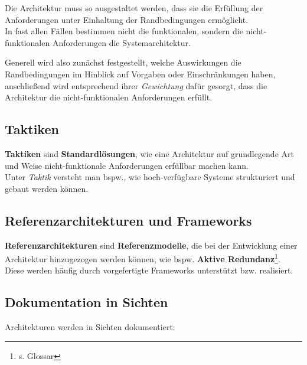\vspace{2mm}
\begin{tcolorbox}
    Die Architektur muss so ausgestaltet werden, dass sie die Erfüllung der Anforderungen unter Einhaltung der Randbedingungen ermöglicht.\\
    In fast allen Fällen bestimmen nicht die funktionalen, sondern die nicht-funktionalen Anforderungen die Systemarchitektur.
\end{tcolorbox}
\vspace{2mm}

\noindent
Generell wird also zunächst festgestellt, welche Auswirkungen die Randbedingungen im Hinblick auf Vorgaben oder Einschränkungen haben, anschließend wird entsprechend ihrer \textit{Gewichtung} dafür gesorgt, dass die Architektur die nicht-funktionalen Anforderungen erfüllt.

\subsection*{Taktiken}
\textbf{Taktiken} sind \textbf{Standardlösungen}, wie eine Architektur auf grundlegende Art und Weise nicht-funktionale Anforderungen erfüllbar machen kann.\\
Unter \textit{Taktik} versteht man bspw., wie hoch-verfügbare Systeme strukturiert und gebaut werden können.

\subsection*{Referenzarchitekturen und Frameworks}
\textbf{Referenzarchitekturen} sind \textbf{Referenzmodelle}, die bei der Entwicklung einer Architektur hinzugezogen werden können, wie bspw. \textbf{Aktive Redundanz}\footnote{s. Glossar}.\\

\noindent
Diese werden häufig durch vorgefertigte Frameworks unterstützt bzw. realisiert.

\subsection*{Dokumentation in Sichten}
Architekturen werden in Sichten dokumentiert:

